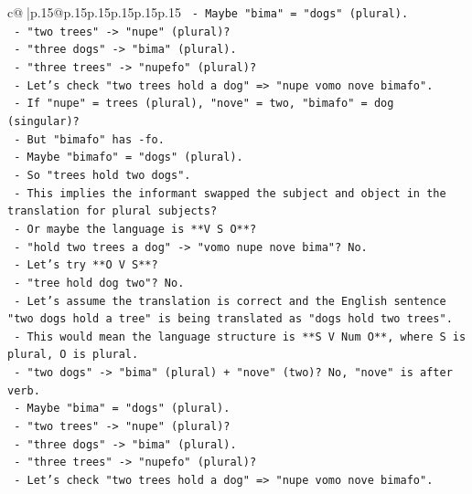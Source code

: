\documentclass{article}
\begin{document}
{\begin{supertabular}{c@{$\;$}|p{.15\linewidth}@{}p{.15\linewidth}p{.15\linewidth}p{.15\linewidth}p{.15\linewidth}p{.15\linewidth}}
{{{\texttt{             {-} Maybe "bima" = "dogs" (plural).} \\
\texttt{             {-} "two trees" {-}> "nupe" (plural)?} \\
\texttt{             {-} "three dogs" {-}> "bima" (plural).} \\
\texttt{             {-} "three trees" {-}> "nupefo" (plural)?} \\
\texttt{             {-} Let's check "two trees hold a dog" => "nupe vomo nove bimafo".} \\
\texttt{             {-} If "nupe" = trees (plural), "nove" = two, "bimafo" = dog (singular)?} \\
\texttt{             {-} But "bimafo" has {-}fo.} \\
\texttt{             {-} Maybe "bimafo" = "dogs" (plural).} \\
\texttt{             {-} So "trees hold two dogs".} \\
\texttt{             {-} This implies the informant swapped the subject and object in the translation for plural subjects?} \\
\texttt{             {-} Or maybe the language is **V S O**?} \\
\texttt{             {-} "hold two trees a dog" {-}> "vomo nupe nove bima"? No.} \\
\texttt{             {-} Let's try **O V S**?} \\
\texttt{             {-} "tree hold dog two"? No.} \\
\texttt{             {-} Let's assume the translation is correct and the English sentence "two dogs hold a tree" is being translated as "dogs hold two trees".} \\
\texttt{             {-} This would mean the language structure is **S V Num O**, where S is plural, O is plural.} \\
\texttt{             {-} "two dogs" {-}> "bima" (plural) + "nove" (two)? No, "nove" is after verb.} \\
\texttt{             {-} Maybe "bima" = "dogs" (plural).} \\
\texttt{             {-} "two trees" {-}> "nupe" (plural)?} \\
\texttt{             {-} "three dogs" {-}> "bima" (plural).} \\
\texttt{             {-} "three trees" {-}> "nupefo" (plural)?} \\
\texttt{             {-} Let's check "two trees hold a dog" => "nupe vomo nove bimafo".} \\
}}}
\end{supertabular}}
\end{document}
